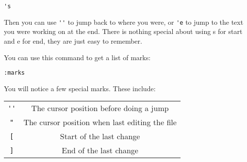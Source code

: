  \begin{Verbatim}[samepage=true]
 's
 \end{Verbatim}

Then you can use \verb!''! to jump back to where you were, or \verb!'e! to jump to the text
you were working on at the end.
There is nothing special about using s for start and e for end, they are
just easy to remember.

You can use this command to get a list of marks:

 \begin{Verbatim}[samepage=true]
 :marks
 \end{Verbatim}

You will notice a few special marks.  These include:
\begin{center}
				\begin{tabular}{c c}
				\verb!''! & The cursor position before doing a jump\\
				\verb!"! & The cursor position when last editing the file\\
				\verb![! & Start of the last change\\
				\verb!]! &   End of the last change\\
\end{tabular}
\end{center}
\clearpage
